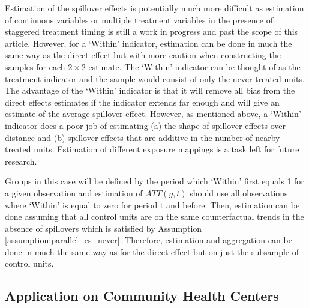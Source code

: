 \documentclass[11pt]{article}
\begin{document}
Estimation of the spillover effects is potentially much more difficult as estimation of continuous variables or multiple treatment variables in the presence of staggered treatment timing is still a work in progress and past the scope of this article. However, for a `Within' indicator, estimation can be done in much the same way as the direct effect but with more caution when constructing the samples for each $2 \times 2$ estimate. The `Within' indicator can be thought of as the treatment indicator and the sample would consist of only the never-treated units. The advantage of the `Within' indicator is that it will remove all bias from the direct effects estimates if the indicator extends far enough and will give an estimate of the average spillover effect. However, as mentioned above, a `Within' indicator does a poor job of estimating (a) the shape of spillover effects over distance and (b) spillover effects that are additive in the number of nearby treated units. Estimation of different exposure mappings is a task left for future research. 

Groups in this case will be defined by the period which `Within' first equals 1 for a given observation and estimation of $ATT(g,t)$ should use all observations where `Within' is equal to zero for period t and before. Then, estimation can be done assuming that all control units are on the same counterfactual trends in the absence of spillovers which is satisfied by Assumption \ref{assumption:parallel_es_never}. Therefore, estimation and aggregation can be done in much the same way as for the direct effect but on just the subsample of control units.


\subsection{Application on Community Health Centers}\label{sec:chc}
\end{document}
